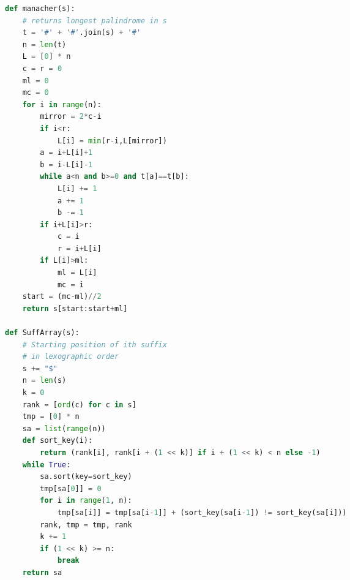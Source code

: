 \documentclass[10pt,landscape, a4paper]{article}
\begin{document}
\begin{multicols*}{3}
\begin{lstlisting}[language=Python]
def manacher(s):
    # returns longest palindrome in s
    t = '#' + '#'.join(s) + '#'
    n = len(t)
    L = [0] * n
    c = r = 0
    ml = 0
    mc = 0
    for i in range(n):
        mirror = 2*c-i
        if i<r:
            L[i] = min(r-i,L[mirror])
        a = i+L[i]+1
        b = i-L[i]-1
        while a<n and b>=0 and t[a]==t[b]:
            L[i] += 1
            a += 1
            b -= 1
        if i+L[i]>r:
            c = i
            r = i+L[i]
        if L[i]>ml:
            ml = L[i]
            mc = i
    start = (mc-ml)//2
    return s[start:start+ml]

def SuffArray(s):
    # Starting position of ith suffix
    # in lexographic order
    s += "$"
    n = len(s)
    k = 0
    rank = [ord(c) for c in s]
    tmp = [0] * n
    sa = list(range(n))
    def sort_key(i):
        return (rank[i], rank[i + (1 << k)] if i + (1 << k) < n else -1)
    while True:
        sa.sort(key=sort_key)
        tmp[sa[0]] = 0
        for i in range(1, n):
            tmp[sa[i]] = tmp[sa[i-1]] + (sort_key(sa[i-1]) != sort_key(sa[i]))
        rank, tmp = tmp, rank
        k += 1
        if (1 << k) >= n:
            break
    return sa
\end{lstlisting}



\end{multicols*}
\end{document}
